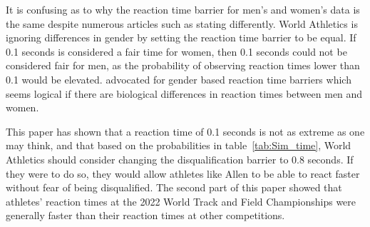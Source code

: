 \documentclass[12pt, letterpaper, titlepage]{article}
\begin{document}
It is confusing as to why the reaction time barrier for men's and women's data
is the same despite numerous articles such as \citep[e.g.,][]{lipps2011implications, 
babicc2009reaction, panoutsakopoulos2020gender} stating differently.  World
Athletics is ignoring differences in gender by setting the reaction time barrier
to be equal. If 0.1 seconds is considered a fair time for women, then 0.1 seconds
could not be considered fair for men, as the probability of observing reaction
times lower than 0.1 would be elevated.  \citet{brosnan2017effects} advocated
for gender based reaction time barriers which seems logical if there are biological
differences in reaction times between men and women.

This paper has shown that a reaction time of 0.1 seconds is not as extreme as
one may think, and that based on the probabilities in table~\ref{tab:Sim_time},
World Athletics should consider changing the disqualification barrier to 0.8
seconds.  If they were to do so, they would allow athletes like Allen to be able
to react faster without fear of being disqualified.  The second part of this
paper showed that athletes' reaction times at the 2022 World Track and Field
Championships were generally faster than their reaction times at other
competitions.



\end{document}
